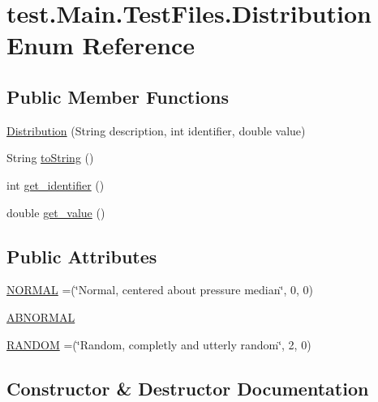 \hypertarget{enumtest_1_1_main_1_1_test_files_1_1_distribution}{}\section{test.\+Main.\+Test\+Files.\+Distribution Enum Reference}
\label{enumtest_1_1_main_1_1_test_files_1_1_distribution}
\subsection*{Public Member Functions}
\begin{DoxyCompactItemize}
\item 
\hyperlink{enumtest_1_1_main_1_1_test_files_1_1_distribution_ad84ae1cbad53377ee9baf4f306a6d52f}{Distribution} (String description, int identifier, double value)
\item 
String \hyperlink{enumtest_1_1_main_1_1_test_files_1_1_distribution_a1f4c59fe2473c50123d0dd80e790f053}{to\+String} ()
\item 
int \hyperlink{enumtest_1_1_main_1_1_test_files_1_1_distribution_a13c4687d062c4d6adf18d985b2bcb9dd}{get\+\_\+identifier} ()
\item 
double \hyperlink{enumtest_1_1_main_1_1_test_files_1_1_distribution_a9319680928ca2f1b3d8eff0a1d5742dd}{get\+\_\+value} ()
\end{DoxyCompactItemize}
\subsection*{Public Attributes}
\begin{DoxyCompactItemize}
\item 
\hyperlink{enumtest_1_1_main_1_1_test_files_1_1_distribution_a5f34eac1288757a970e50ece15e6c428}{N\+O\+R\+M\+AL} =(\char`\"{}Normal, centered about pressure median\char`\"{}, 0, 0)
\item 
\hyperlink{enumtest_1_1_main_1_1_test_files_1_1_distribution_a4144db22dc508223620033eab909a1f9}{A\+B\+N\+O\+R\+M\+AL}
\item 
\hyperlink{enumtest_1_1_main_1_1_test_files_1_1_distribution_a5aab7ec6b569f40c80559ab94adbbcbc}{R\+A\+N\+D\+OM} =(\char`\"{}Random, completly and utterly random\char`\"{}, 2, 0)
\end{DoxyCompactItemize}


\subsection{Constructor \& Destructor Documentation}
